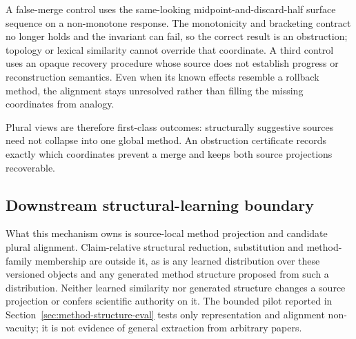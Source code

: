 A false-merge control uses the same-looking midpoint-and-discard-half surface
sequence on a non-monotone response. The monotonicity and bracketing contract
no longer holds and the invariant can fail, so the correct result is an
obstruction; topology or lexical similarity cannot override that coordinate. A
third control uses an opaque recovery procedure whose source does not
establish progress or reconstruction semantics. Even when its known effects
resemble a rollback method, the alignment stays unresolved rather than filling
the missing coordinates from analogy.

Plural views are therefore first-class outcomes: structurally suggestive
sources need not collapse into one global method. An obstruction certificate
records exactly which coordinates prevent a merge and keeps both source
projections recoverable.

\subsection{Downstream structural-learning boundary}

What this mechanism owns is source-local method projection and candidate
plural alignment. Claim-relative structural reduction, substitution and
method-family membership are outside it, as is any learned distribution over
these versioned objects and any generated method structure proposed from such
a distribution. Neither learned similarity nor generated structure changes a
source projection or confers scientific authority on it. The bounded pilot
reported in Section~\ref{sec:method-structure-eval} tests only representation
and alignment non-vacuity; it is not evidence of general extraction from
arbitrary papers.

\endinput
